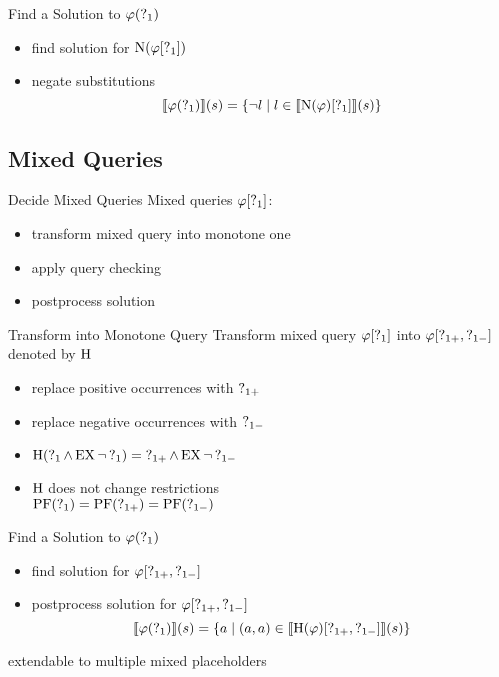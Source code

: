 \begin{frame}{Find a Solution to $\varphi(\operatorname{?}_1)$}
  \begin{itemize}
    \item find solution for $\operatorname{N}(\varphi[\operatorname{?}_1])$
    \item negate substitutions \\
      \[
        \llbracket \varphi(\operatorname{?}_1) \rrbracket (s) = \{ \lnot l \mid l \in 
          \llbracket \operatorname{N}(\varphi)[\operatorname{?}_1] \rrbracket (s) \}
      \]
  \end{itemize}
\end{frame}



\subsection{Mixed Queries}%

\begin{frame}{Decide Mixed Queries}
  Mixed queries $\varphi[\operatorname{?}_1]$:
  \begin{itemize}
    \item transform mixed query into monotone one
    \item apply query checking
    \item postprocess solution
  \end{itemize}
\end{frame}

\begin{frame}{Transform into Monotone Query}
  Transform mixed query $\varphi[\operatorname{?}_1]$ into $\varphi[\operatorname{?}_{1+},\operatorname{?}_{1-}]$ 
  denoted by $\operatorname{H}$
  \begin{itemize}
    \item replace positive occurrences with $\operatorname{?}_{1+}$
    \item replace negative occurrences with $\operatorname{?}_{1-}$
    \item $\operatorname{H}(\operatorname{?}_1 \land \operatorname{EX} \lnot \operatorname{?}_1) = \operatorname{?}_{1+} \land \operatorname{EX} \lnot \operatorname{?}_{1-}$
    \item $\operatorname{H}$ does not change restrictions \\ 
          $\operatorname{PF}(\operatorname{?}_{1}) = \operatorname{PF}(\operatorname{?}_{1+}) = \operatorname{PF}(\operatorname{?}_{1-})$
  \end{itemize}
\end{frame}

\begin{frame}{Find a Solution to $\varphi(\operatorname{?}_1)$}
  \begin{itemize}
    \item find solution for $\varphi[\operatorname{?}_{1+},\operatorname{?}_{1-}]$
    \item postprocess solution for $\varphi[\operatorname{?}_{1+},\operatorname{?}_{1-}]$
      \[
        \llbracket \varphi(\operatorname{?}_1) \rrbracket (s) = \{ a \mid (a,a) \in 
          \llbracket \operatorname{H} (\varphi)[\operatorname{?}_{1+},\operatorname{?}_{1-}] \rrbracket (s) \}
      \]
  \end{itemize}
  
  extendable to multiple mixed placeholders
\end{frame}
